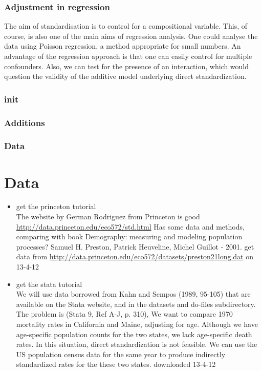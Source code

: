 \documentclass[a4paper]{beamer}
\begin{document}
\begin{frame}
\frametitle{Adjustment in regression}
\label{sec-5}

The aim of standardisation is to control for a compositional variable. This, of course, is also one of the main aims of regression analysis. One could analyse the data using Poisson regression, a method appropriate for small numbers. An advantage of the regression approach is that one can easily control for multiple confounders. Also, we can test for the presence of an interaction, which would question the validity of the additive model underlying direct standardization. 
\end{frame}
\begin{frame}
\frametitle{init}
\label{sec-6}
\end{frame}
\begin{frame}
\frametitle{Additions}
\label{sec-7}
\end{frame}
\begin{frame}
\frametitle{Data}
\label{sec-8}

\section{Data}
\begin{itemize}

\item get the princeton tutorial\\
\label{sec-8-1}%
The website by German Rodriguez from Princeton is good \href{http://data.princeton.edu/eco572/std.html}{http://data.princeton.edu/eco572/std.html}
Has some data and methods, comparing with book Demography: measuring and modeling population processes? Samuel H. Preston, Patrick Heuveline, Michel Guillot - 2001.
get data from \href{http://data.princeton.edu/eco572/datasets/preston21long.dat}{http://data.princeton.edu/eco572/datasets/preston21long.dat}
on 13-4-12



\item get the stata tutorial\\
\label{sec-8-2}%
We will use data borrowed from Kahn and Sempos (1989, 95-105) that are available on the Stata website, and in the datasets and do-files subdirectory.  The problem is (Stata 9, Ref A-J, p. 310), We want to compare 1970 mortality rates in California and Maine, adjusting for age.  Although we have age-specific population counts for the two states, we lack age-specific death rates.  In this situation, direct standardization is not feasible.  We can use the US population census data for the same year to produce indirectly standardized rates for the these two states.       
downloaded 13-4-12



\end{itemize} %
\end{frame}
\end{document}
